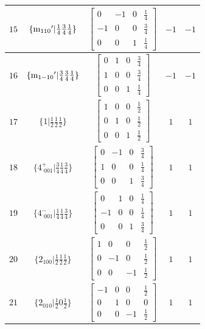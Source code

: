 \documentclass[fleqn,8pt]{jsarticle}
\begin{document}
\begin{longtable}{ccccc}
$ 15 $ & $ \{{\rm m}_{110}{}'|\frac{1}{4} \frac{3}{4} \frac{1}{4}\} $ & $ \begin{bmatrix} 0 & -1 & 0 & \frac{1}{4} \\ -1 & 0 & 0 & \frac{3}{4} \\ 0 & 0 & 1 & \frac{1}{4} \end{bmatrix} $ & $ -1 $ & $ -1 $ \\ \hline
$ 16 $ & $ \{{\rm m}_{1-10}{}'|\frac{3}{4} \frac{3}{4} \frac{1}{4}\} $ & $ \begin{bmatrix} 0 & 1 & 0 & \frac{3}{4} \\ 1 & 0 & 0 & \frac{3}{4} \\ 0 & 0 & 1 & \frac{1}{4} \end{bmatrix} $ & $ -1 $ & $ -1 $ \\ \hline
$ 17 $ & $ \{1|\frac{1}{2} \frac{1}{2} \frac{1}{2}\} $ & $ \begin{bmatrix} 1 & 0 & 0 & \frac{1}{2} \\ 0 & 1 & 0 & \frac{1}{2} \\ 0 & 0 & 1 & \frac{1}{2} \end{bmatrix} $ & $ 1 $ & $ 1 $ \\ \hline
$ 18 $ & $ \{4^{+}_{\,\,001}|\frac{3}{4} \frac{1}{4} \frac{3}{4}\} $ & $ \begin{bmatrix} 0 & -1 & 0 & \frac{3}{4} \\ 1 & 0 & 0 & \frac{1}{4} \\ 0 & 0 & 1 & \frac{3}{4} \end{bmatrix} $ & $ 1 $ & $ 1 $ \\ \hline
$ 19 $ & $ \{4^{-}_{\,\,001}|\frac{1}{4} \frac{1}{4} \frac{3}{4}\} $ & $ \begin{bmatrix} 0 & 1 & 0 & \frac{1}{4} \\ -1 & 0 & 0 & \frac{1}{4} \\ 0 & 0 & 1 & \frac{3}{4} \end{bmatrix} $ & $ 1 $ & $ 1 $ \\ \hline
$ 20 $ & $ \{2{}_{100}|\frac{1}{2} \frac{1}{2} \frac{1}{2}\} $ & $ \begin{bmatrix} 1 & 0 & 0 & \frac{1}{2} \\ 0 & -1 & 0 & \frac{1}{2} \\ 0 & 0 & -1 & \frac{1}{2} \end{bmatrix} $ & $ 1 $ & $ 1 $ \\ \hline
$ 21 $ & $ \{2{}_{010}|\frac{1}{2} 0 \frac{1}{2}\} $ & $ \begin{bmatrix} -1 & 0 & 0 & \frac{1}{2} \\ 0 & 1 & 0 & 0 \\ 0 & 0 & -1 & \frac{1}{2} \end{bmatrix} $ & $ 1 $ & $ 1 $ \\ \hline

\end{longtable}
\end{document}
